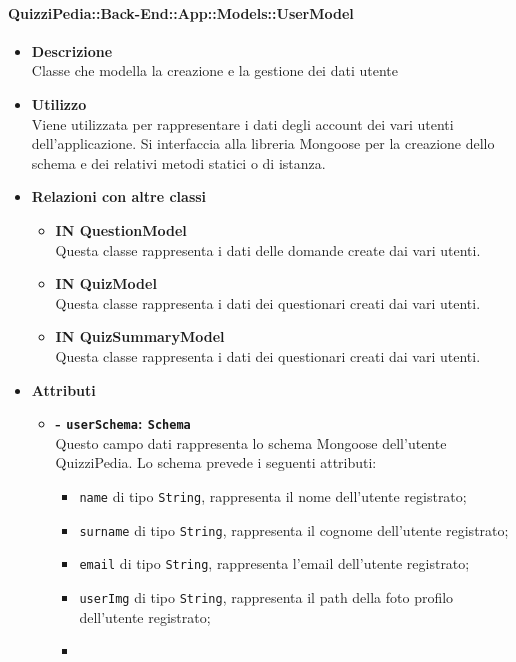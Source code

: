 \paragraph{QuizziPedia::Back-End::App::Models::UserModel}
\begin{itemize}
	\item \textbf{Descrizione} \\
	Classe che modella la creazione e la gestione dei dati utente
	\item \textbf{Utilizzo} \\
	Viene utilizzata per rappresentare i dati degli account dei vari utenti dell’applicazione. Si interfaccia alla libreria Mongoose per la creazione dello schema e dei relativi metodi statici o di istanza.
	\item \textbf{Relazioni con altre classi} 
		\begin{itemize}
			\item \textbf{IN QuestionModel} \\
			Questa classe rappresenta i dati delle domande create dai vari utenti.
			\item \textbf{IN QuizModel} \\
			Questa classe rappresenta i dati dei questionari creati dai vari utenti.
			\item \textbf{IN QuizSummaryModel} \\
			Questa classe rappresenta i dati dei questionari creati dai vari utenti.
		\end{itemize}
	\item \textbf{Attributi} 
		\begin{itemize}
			\item \textbf{- \texttt{userSchema}: \texttt{Schema}} \\
			Questo campo dati rappresenta lo schema Mongoose dell'utente QuizziPedia. Lo schema prevede i seguenti attributi:
			\begin{itemize}
				\item 
					\texttt{name} di tipo \texttt{String}, rappresenta il nome  dell'utente registrato;
				\item 
					\texttt{surname} di tipo \texttt{String}, rappresenta il cognome  dell'utente registrato;
				\item 
					\texttt{email} di tipo \texttt{String}, rappresenta l'email  dell'utente registrato;
				\item 
					\texttt{userImg} di tipo \texttt{String}, rappresenta il path della foto profilo dell'utente registrato;
				\item 

\end{itemize}
\end{itemize}
\end{itemize}
